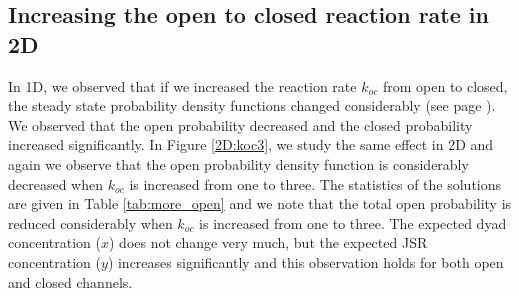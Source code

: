 


\subsection{Increasing the open to closed reaction rate in 2D}

In 1D, we observed that if we increased the reaction rate $k_{oc}$  from open to closed, the steady state probability density functions changed considerably (see page \pageref{increasingkoc}). We observed that the open probability decreased and the closed probability increased significantly. In Figure \ref{2D:koc3}, we study the same effect in 2D and again we observe that the open probability density function is considerably decreased when $k_{oc}$ is increased from one to three. The statistics of the solutions are given in Table \ref{tab:more_open} and we note that the total open probability is reduced considerably 
when $k_{oc}$ is increased from one to three. The expected dyad concentration ($x$) does not change very much, but the expected JSR concentration ($y$) increases significantly and this observation holds for both open and closed channels. 




